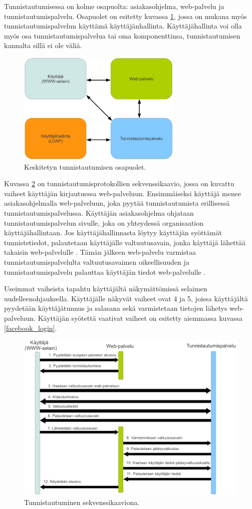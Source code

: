 Tunnistautumisessa on kolme osapuolta: asiakasohjelma, web-palvelu ja tunnistautumispalvelu. Osapuolet on esitetty kuvassa \ref{composition}, jossa on mukana myös tunnistautumispalvelun käyttämä käyttäjänhallinta. Käyttäjähallinta voi olla myös osa tunnistautumispalvelua tai oma komponenttinsa, tunnistautumisen kannalta sillä ei ole väliä.

\begin{figure}[ht]
\centering
\includegraphics[width=0.7\textwidth]{teknologiat/composition.eps}
\caption{Keskitetyn tunnistautumisen osapuolet.}%
\label{composition}
\end{figure}

Kuvassa \ref{oauth} on tunnistautumisprotokollien sekvenssikaavio, jossa on kuvattu vaiheet käyttäjän kirjautuessa web-palveluun. Ensimmäiseksi käyttäjä menee asiakasohjelmalla web-palveluun, joka pyytää tunnistautumista erillisessä tunnistautumispalvelussa. Käyttäjän asiakasohjelma ohjataan tunnistautumispalvelun sivulle, joka on yhteydessä organisaation käyttäjähallintaan. Jos käyttäjähallinnasta löytyy käyttäjän syöttämät tunnistetiedot, palautetaan käyttäjälle valtuutusavain, jonka käyttäjä lähettää takaisin web-palvelulle \cite{nisti}. Tämän jälkeen web-palvelu varmistaa tunnistautumispalvelulta valtuutusavaimen oikeellisuuden ja tunnistautumispalvelu palauttaa käyttäjän tiedot web-palvelulle \cite{nisti}.

Useimmat vaiheista tapahtu käyttäjältä näkymättömissä selaimen uudelleenohjauksella. Käyttäjälle näkyvät vaiheet ovat 4 ja 5, joissa käyttäjältä pyydetään käyttäjätunnus ja salasana sekä varmistetaan tietojen lähetys web-palveluun. Käyttäjän syötettä vaativat vaiheet on esitetty aiemmassa kuvassa \ref{facebook_login}.

\begin{figure}[ht]
\centering
\includegraphics[width=\textwidth]{teknologiat/protokollat/oauth.eps}
\caption{Tunnistautuminen sekvenssikaaviona.}%
\label{oauth}
\end{figure}